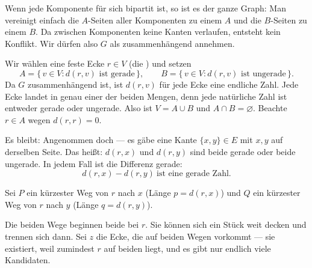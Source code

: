 \begin{merksatz}
Wenn jede Komponente für sich bipartit ist, so ist es der ganze Graph: Man vereinigt einfach die $A$-Seiten aller Komponenten zu einem $A$ und die $B$-Seiten zu einem $B$. Da zwischen Komponenten keine Kanten verlaufen, entsteht kein Konflikt. Wir dürfen also $G$ als zusammenhängend annehmen.

Wir wählen eine feste Ecke $r \in V$ (die ) und setzen
\[ A = \{\, v \in V : d(r,v) \text{ ist gerade} \,\}, \qquad
   B = \{\, v \in V : d(r,v) \text{ ist ungerade} \,\} . \]
Da $G$ zusammenhängend ist, ist $d(r,v)$ für jede Ecke eine endliche Zahl. Jede Ecke landet in genau einer der beiden Mengen, denn jede natürliche Zahl ist entweder gerade oder ungerade. Also ist $V = A \cup B$ und $A \cap B = \varnothing$. Beachte $r \in A$ wegen $d(r,r) = 0$.

Es bleibt:  Angenommen doch --- es gäbe eine Kante $\{x,y\} \in E$ mit $x, y$ auf derselben Seite. Das heißt: $d(r,x)$ und $d(r,y)$ sind beide gerade oder beide ungerade. In jedem Fall ist die Differenz gerade:
\[ d(r,x) - d(r,y) \ \text{ist eine gerade Zahl.} \]

Sei $P$ ein kürzester Weg von $r$ nach $x$ (Länge $p = d(r,x)$) und $Q$ ein kürzester Weg von $r$ nach $y$ (Länge $q = d(r,y)$).

Die beiden Wege beginnen beide bei $r$. Sie können sich ein Stück weit decken und trennen sich dann. Sei $z$ die  Ecke, die auf beiden Wegen vorkommt --- sie existiert, weil zumindest $r$ auf beiden liegt, und es gibt nur endlich viele Kandidaten.

\begin{center}
\end{center}


\end{merksatz}
